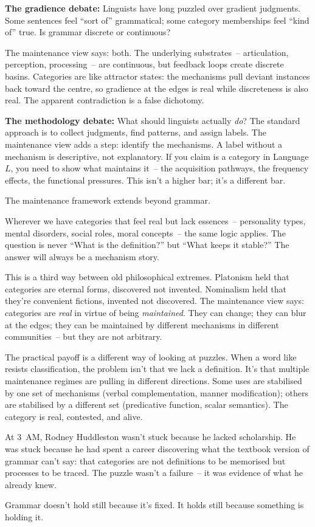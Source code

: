 \textbf{The gradience debate:} Linguists have long puzzled over gradient judgments. Some sentences feel \enquote{sort of} grammatical; some category memberships feel \enquote{kind of} true. Is grammar discrete or continuous?

The maintenance view says: both. The underlying substrates~-- articulation, perception, processing~-- are continuous, but feedback loops create discrete basins. Categories are like attractor states: the mechanisms pull deviant instances back toward the centre, so gradience at the edges is real while discreteness is also real. The apparent contradiction is a false dichotomy.

\textbf{The methodology debate:} What should linguists actually \emph{do}? The standard approach is to collect judgments, find patterns, and assign labels. The maintenance view adds a step: identify the mechanisms. A label without a mechanism is descriptive, not explanatory. If you claim  is a category in Language $L$, you need to show what maintains it~-- the acquisition pathways, the frequency effects, the functional pressures. This isn't a higher bar; it's a different bar.

\bigskip

The maintenance framework extends beyond grammar.

Wherever we have categories that feel real but lack essences~-- personality types, mental disorders, social roles, moral concepts~-- the same logic applies. The question is never \enquote{What is the definition?} but \enquote{What keeps it stable?} The answer will always be a mechanism story.

This is a third way between old philosophical extremes. Platonism held that categories are eternal forms, discovered not invented. Nominalism held that they're convenient fictions, invented not discovered. The maintenance view says: categories are \emph{real} in virtue of being \emph{maintained}. They can change; they can blur at the edges; they can be maintained by different mechanisms in different communities~-- but they are not arbitrary.

The practical payoff is a different way of looking at puzzles. When a word like  resists classification, the problem isn't that we lack a definition. It's that multiple maintenance regimes are pulling in different directions. Some uses are stabilised by one set of mechanisms (verbal complementation, manner modification); others are stabilised by a different set (predicative function, scalar semantics). The category is real, contested, and alive.

At 3~AM, Rodney Huddleston wasn't stuck because he lacked scholarship. He was stuck because he had spent a career discovering what the textbook version of grammar can't say: that categories are not definitions to be memorised but processes to be traced. The puzzle wasn't a failure~-- it was evidence of what he already knew.

Grammar doesn't hold still because it's fixed. It holds still because something is holding it.
